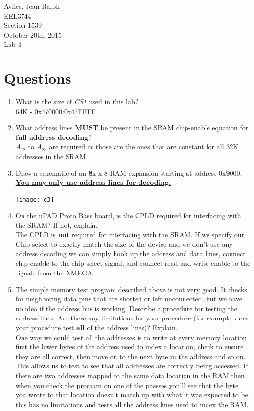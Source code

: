 \documentclass[letterpaper, 12pt]{article}
\newcommand{\hwnumber}{Lab 4}
\newcommand{\duedate}{October 20th, 2015}
\newcommand{\capper}{\begin{flushright}Aviles, Jean-Ralph \\ EEL3744 \\ Section 1539 \\ \duedate{} \\ \hwnumber{}\end{flushright}}
\begin{document}
\capper{}
\section*{Questions}
\begin{enumerate}
  \item What is the size of \textit{CS1} used in this lab? \\
    \hspace*{8pt} 64K - 0x470000:0x47FFFF
  \item What address lines \textbf{MUST} be present in the SRAM chip-enable equation for \textbf{full address decoding}? \\
    \hspace*{8pt} $A_{12}$ to $A_{23}$ are required as those are the ones that are constant for all 32K addresses in the SRAM.
  \item Draw a schematic of an \textbf{8}k x 8 RAM expansion starting at address 0x\textbf{9}000. \\ \underline{\textbf{You may only use address lines for decoding.}} \\
    \begin{center}
      \texttt{[image: q3]}
    \end{center}
  \item On the uPAD Proto Base board, is the CPLD required for interfacing with the SRAM? If not, explain. \\
    \hspace*{8pt} The CPLD is \textbf{not} required for interfacing with the SRAM. If we specify our Chip-select to exactly match the size of the device and we don't use any address decoding we can simply hook up the address and data lines, connect chip-enable to the chip select signal, and connect read and write enable to the signals from the XMEGA.
  \item The simple memory test program described above is not very good. It checks for neighboring data pins that are shorted or left unconnected, but we have no idea if the address bus is working. Describe a procedure for testing the address lines. Are there any limitations for your procedure (for example, does your procedure test \textbf{all} of the address lines)? Explain. \\
    \hspace*{8pt} One way we could test all the addresses is to write at every memory location first the lower bytes of the address used to index a location, check to ensure they are all correct, then move on to the next byte in the address and so on. This allows us to test to see that all addresses are correctly being accessed. If there are two addresses mapped to the same data location in the RAM then when you check the program on one of the passses you'll see that the byte you wrote to that location doesn't match up with what it was expected to be. this has no limitations and tests all the address lines used to index the RAM.

\end{enumerate}
\end{document}
